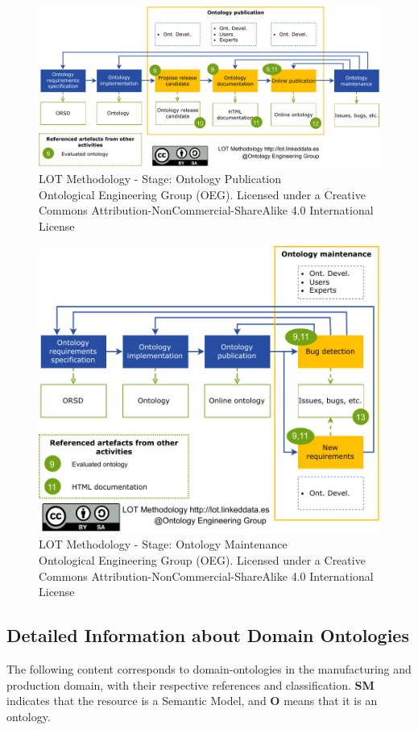 \documentclass{guideline/sty/rapport}
\begin{document}
    \begin{figure}[H]
        \centering
          \includegraphics[width=1.1\textwidth]{images/LOTFigure5.pdf}
          \caption{LOT Methodology - Stage: Ontology Publication \\ Ontological Engineering Group (OEG). Licensed under a Creative Commons Attribution-NonCommercial-ShareAlike 4.0 International License}
    \label{fig:lotfigure5}
    \end{figure}
    
        \begin{figure}[H]
        \centering
          \includegraphics[width=\textwidth]{images/LOTFigure6.pdf}
          \caption{LOT Methodology - Stage: Ontology Maintenance \\ Ontological Engineering Group (OEG). Licensed under a Creative Commons Attribution-NonCommercial-ShareAlike 4.0 International License}
    \label{fig:lotfigure6}
    \end{figure}
    
\subsection{Detailed Information about Domain Ontologies} \label{sec:detaileddomainontologies}
The following content corresponds to domain-ontologies in the manufacturing and production domain, with their respective references and classification. \textbf{SM} indicates that the resource is a Semantic Model, and \textbf{O} means that it is an ontology.


\end{document}
